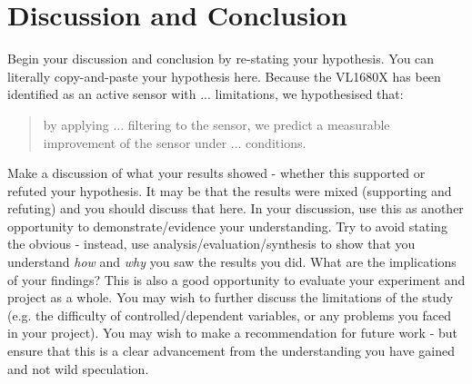 \documentclass[conference]{IEEEtran}
\begin{document}
\section{Discussion and Conclusion}
Begin your discussion and conclusion by re-stating your hypothesis.  You can literally copy-and-paste your hypothesis here.  
Because the VL1680X has been identified as an active sensor with ... limitations, we hypothesised that:
\begin{quote}
    by applying ... filtering to the sensor, we predict a measurable improvement of the sensor under ... conditions.  
\end{quote}
Make a discussion of what your results showed - whether this supported or refuted your hypothesis.  It may be that the results were mixed (supporting and refuting) and you should discuss that here. In your discussion, use this as another opportunity to demonstrate/evidence your understanding. Try to avoid stating the obvious - instead, use analysis/evaluation/synthesis to show that you understand \emph{how} and \emph{why} you saw the results you did.  What are the implications of your findings?  
This is also a good opportunity to evaluate your experiment and project as a whole.  You may wish to further discuss the limitations of the study (e.g. the difficulty of controlled/dependent variables, or any problems you faced in your project).  You may wish to make a recommendation for future work - but ensure that this is a clear advancement from the understanding you have gained and not wild speculation.


 

\end{document}
